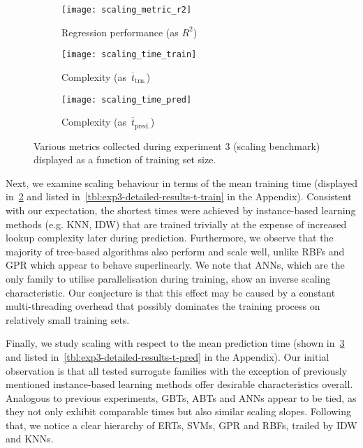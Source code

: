 \begin{figure}[h]
	\centering
	\begin{subfigure}[b]{0.333\textwidth}
		\centering
		\texttt{[image: scaling\_metric\_r2]}
		\caption{Regression performance (as $R^2$)}
		\label{fig:scaling-r2}
	\end{subfigure}\hfill%
	\begin{subfigure}[b]{0.333\textwidth}
		\centering
		\texttt{[image: scaling\_time\_train]}
		\caption{Complexity (as~$\overline{t}_{\text{trn.}}$)}
		\label{fig:scaling-trn}
	\end{subfigure}\hfill%
	\begin{subfigure}[b]{0.333\textwidth}
		\centering
		\texttt{[image: scaling\_time\_pred]}
		\caption{Complexity (as~$\overline{t}_{\text{pred.}}$)}
		\label{fig:scaling-pred}
	\end{subfigure}
	\caption{Various metrics collected during experiment 3 (scaling
	benchmark) displayed as a function of training set size.}
	\label{fig:scaling}
\end{figure}

Next, we examine scaling behaviour in terms of the mean training time (displayed
in~\cref{fig:scaling-trn} and listed in~\cref{tbl:exp3-detailed-results-t-train} in
the Appendix). Consistent with our expectation, the shortest times
were achieved by instance-based learning methods (e.g. KNN, IDW) that
are trained trivially at the expense of increased lookup complexity later during prediction.
Furthermore, we observe that the majority of tree-based algorithms also perform
and scale well, unlike RBFs and GPR which appear to behave superlinearly. We note that ANNs,
which are the only family to utilise parallelisation during training, show an
inverse scaling characteristic. Our conjecture is that this effect may be caused
by a constant multi-threading overhead that possibly dominates the training process
on relatively small training sets.

Finally, we study scaling with respect to the mean prediction time (shown
in~\cref{fig:scaling-pred} and listed in~\cref{tbl:exp3-detailed-results-t-pred} in
the Appendix). Our initial observation is that all tested
surrogate families with the exception of previously mentioned instance-based
learning methods offer desirable characteristics overall. Analogous to previous
experiments, GBTs, ABTs and ANNs appear to be tied, as they not only exhibit
comparable times but also similar scaling slopes. Following that, we notice a
clear hierarchy of ERTs, SVMs, GPR and RBFs, trailed by IDW and KNNs.



